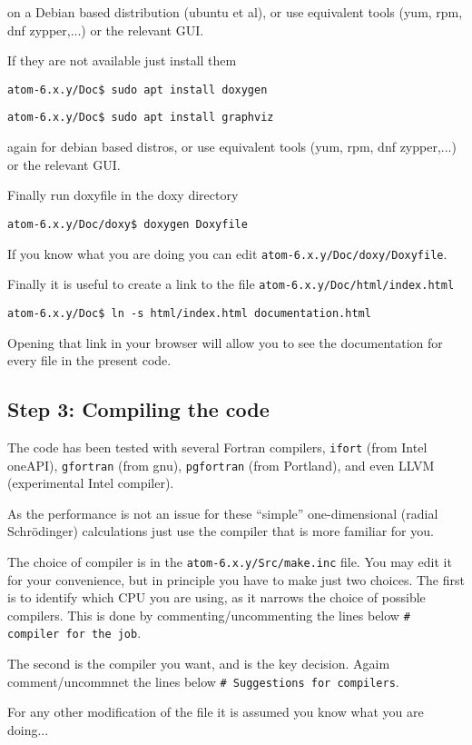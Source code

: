 \documentclass[11pt]{article}
\begin{document}
on a Debian based distribution (ubuntu et al), or use equivalent tools (yum, rpm, dnf zypper,...) or the relevant GUI.

If they are not available just install them

\noindent\texttt{atom-6.x.y/Doc\$ sudo apt install doxygen}

\noindent\texttt{atom-6.x.y/Doc\$ sudo apt install graphviz}

again for debian based distros, or use equivalent tools (yum, rpm, dnf zypper,...) or the relevant GUI.

Finally run doxyfile in the doxy directory

\noindent\texttt{atom-6.x.y/Doc/doxy\$ doxygen Doxyfile}

If you know what you are doing you can edit \texttt{atom-6.x.y/Doc/doxy/Doxyfile}.

Finally it is useful to create a link to the file \texttt{atom-6.x.y/Doc/html/index.html}

\noindent\texttt{atom-6.x.y/Doc\$ ln -s html/index.html documentation.html}

Opening that link in your browser will allow you to see the documentation for every file in the present code.

\subsection{Step 3: Compiling the code}
\label{sec:step3}

The code has been tested with several Fortran compilers, \texttt{ifort} (from Intel oneAPI), 
\texttt{gfortran} (from gnu), 
\texttt{pgfortran} (from Portland), and even LLVM (experimental Intel compiler).

As the performance is not an issue for these ``simple'' one-dimensional (radial Schrödinger) calculations
just use the compiler that is more familiar for you.

The choice of compiler is in the \texttt{atom-6.x.y/Src/make.inc} file.  You may edit it for your convenience,
but in principle you have to make just two choices.  The first is to identify which CPU you are using,
as it narrows the choice of possible compilers.  This is done by commenting/uncommenting
the lines below \texttt{\#   compiler for the job}.

The second is the compiler you want, and is the key decision.  Agaim comment/uncommnet the lines below
\texttt{\#   Suggestions for compilers}.

For any other modification of the file it is assumed you know what you are doing...
\end{document}
